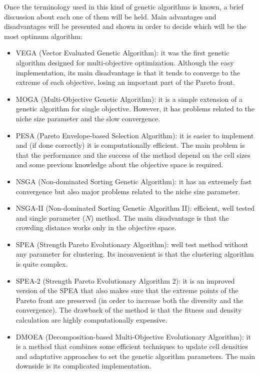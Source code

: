     Once the terminology used in this kind of genetic algorithms is known, a brief discussion about each one of them will be held. Main advantages and disadvantages will be presented and shown in order to decide which will be the most optimum algorithm:

    \newpage

    \begin{itemize}
        \item VEGA (Vector Evaluated Genetic Algorithm): it was the first genetic algorithm designed for multi-objective optimization. Although the easy implementation, its main disadvantage is that it tends to converge to the extreme of each objective, losing an important part of the Pareto front.
        \item MOGA (Multi-Objective Genetic Algorithm): it is a simple extension of a genetic algorithm for single objective. However, it has problems related to the niche size parameter and the slow convergence.
        \item PESA (Pareto Envelope-based Selection Algorithm): it is easier to implement and (if done correctly) it is computationally efficient. The main problem is that the performance and the success of the method depend on the cell sizes and some previous knowledge about the objective space is required.
        \item NSGA (Non-dominated Sorting Genetic Algorithm): it has an extremely fast convergence but also major problems related to the niche size parameter.
        \item NSGA-II (Non-dominated Sorting Genetic Algorithm II): efficient, well tested and single parameter ($N$) method. The main disadvantage is that the crowding distance works only in the objective space.
        \item SPEA (Strength Pareto Evolutionary Algorithm): well test method without any parameter for clustering. Its inconvenient is that the clustering algorithm is quite complex.
        \item SPEA-2 (Strength Pareto Evolutionary Algorithm 2): it is an improved version of the SPEA that also makes sure that the extreme points of the Pareto front are preserved (in order to increase both the diversity and the convergence). The drawback of the method is that the fitness and density calculation are highly computationally expensive.
        \item DMOEA (Decomposition-based Multi-Objective Evolutionary Algorithm): it is a method that combines some efficient techniques to update cell densities and adaptative approaches to set the genetic algorithm parameters. The main downside is its complicated implementation.
    \end{itemize}
    
